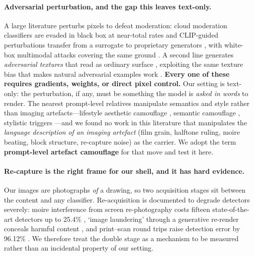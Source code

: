 \documentclass[11pt]{article}
\begin{document}
\paragraph{Adversarial perturbation, and the gap this leaves text-only.}
A large literature perturbs pixels to defeat moderation: cloud moderation
classifiers are evaded in black box at near-total rates
\citep{universalperturb} and CLIP-guided perturbations transfer from a surrogate
to proprietary generators \citep{clipproxy}, with white-box multimodal attacks
covering the same ground \citep{mmadiffusion,advi2i,unfiltered}. A second line
generates \emph{adversarial textures} that read as ordinary surface
\citep{advtexture,advcat,pgcap}, exploiting the same texture bias that makes
natural adversarial examples work \citep{texturebias}. \textbf{Every one of
these requires gradients, weights, or direct pixel control.} Our setting is
text-only: the perturbation, if any, must be something the model is
\emph{asked in words} to render. The nearest prompt-level relatives manipulate
semantics and style rather than imaging artefacts---lifestyle aesthetic
camouflage \citep{aestheticcamouflage}, semantic camouflage
\citep{etch}, stylistic triggers \citep{styletrigger}---and we found no work in
this literature that manipulates the \emph{language description of an imaging
artefact} (film grain, halftone ruling, moire beating, block structure,
re-capture noise) as the carrier. We adopt the term
\textbf{prompt-level artefact camouflage} for that move and test it here.

\paragraph{Re-capture is the right frame for our shell, and it has hard
evidence.} Our images are photographs \emph{of} a drawing, so two acquisition
stages sit between the content and any classifier. Re-acquisition is documented
to degrade detectors severely: moire interference from screen re-photography
costs fifteen state-of-the-art detectors up to 25.4\% \citep{moire}, `image
laundering' through a generative re-render conceals harmful content
\citep{laundering}, and print--scan round trips raise detection error by
96.12\% \citep{printscan}. We therefore treat the double stage as a mechanism to
be measured rather than an incidental property of our setting.
\end{document}

